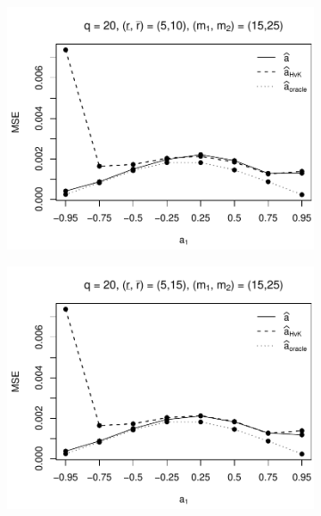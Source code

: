 \begin{figure}[p]
\begin{subfigure}[b]{0.45\textwidth}
\includegraphics[width=\textwidth]{Plots/Plots_Supplement/MSE_a_T=500_slope=1_(L1,L2,K1,K2,M1,M2)=(20,20,5,10,15,25).pdf}
\end{subfigure}
\hspace{0.25cm}
\begin{subfigure}[b]{0.45\textwidth}
\includegraphics[width=\textwidth]{Plots/Plots_Supplement/MSE_a_T=500_slope=1_(L1,L2,K1,K2,M1,M2)=(20,20,5,15,15,25).pdf}
\end{subfigure}


\end{figure}
